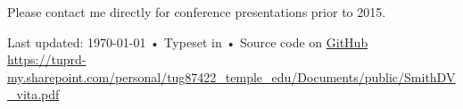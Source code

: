 \documentclass[11pt, letterpaper]{article}
\begin{document}
\vspace{.5cm}
Please contact me directly for conference presentations prior to 2015. 




\vfill{}

\begin{center}
{\scriptsize  Last updated: \today\- •\-
Typeset in \href{http://nitens.org/taraborelli/cvtex}{\XeTeX} •\- Source code on \href{https://github.com/DVSneuro/my-cv}{GitHub}\\
\href{https://tuprd-my.sharepoint.com/personal/tug87422\_temple\_edu/Documents/public/SmithDV\_vita.pdf}{https://tuprd-my.sharepoint.com/personal/tug87422\_temple\_edu/Documents/public/SmithDV\_vita.pdf}}
\end{center}
\end{document}

